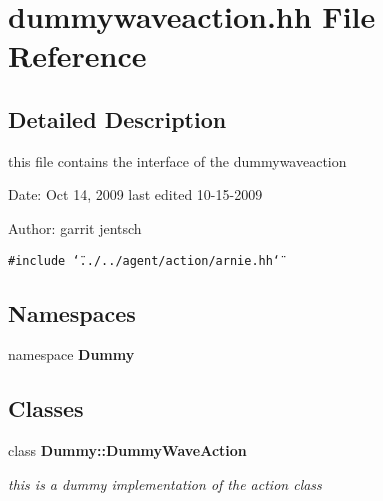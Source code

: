\section{dummywaveaction.hh File Reference}
\label{dummywaveaction_8hh}


\subsection{Detailed Description}
this file contains the interface of the dummywaveaction

\begin{Desc}
\item[Date:]Oct 14, 2009 last edited 10-15-2009\end{Desc}
\begin{Desc}
\item[Author:]garrit jentsch \end{Desc}


{\tt \#include \char`\"{}../../agent/action/arnie.hh\char`\"{}}\par
\subsection*{Namespaces}
\begin{CompactItemize}
\item 
namespace {\bf Dummy}
\end{CompactItemize}
\subsection*{Classes}
\begin{CompactItemize}
\item 
class {\bf Dummy::DummyWaveAction}
\begin{CompactList}\small\item\em this is a dummy implementation of the action class \item\end{CompactList}\end{CompactItemize}
